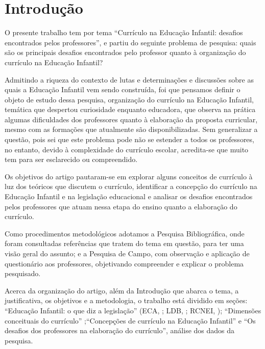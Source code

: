 \begin{refsection}
\begin{otherlanguage}{english}
    \end{otherlanguage}

    \section{Introdução}

    O presente trabalho tem por tema “Currículo na Educação Infantil: desafios encontrados pelos professores”, e partiu do seguinte problema de pesquisa: quais são os principais desafios encontrados pelo professor quanto à organização do currículo na Educação Infantil?  

    Admitindo a riqueza do contexto de lutas e determinações e discussões sobre as quais a Educação Infantil vem sendo construída, foi que pensamos definir o objeto de estudo dessa pesquisa, organização do currículo na Educação Infantil, temática que despertou curiosidade enquanto educadora, que observa na prática algumas dificuldades dos professores quanto à elaboração da proposta curricular, mesmo com as formações que atualmente são disponibilizadas. Sem generalizar a questão, pois sei que este problema pode não se estender a todos os professores, no entanto, devido à complexidade do currículo escolar, acredita-se que muito tem para ser esclarecido ou compreendido. 

    Os objetivos do artigo pautaram-se em explorar alguns conceitos de currículo à luz dos teóricos que discutem o currículo, identificar a concepção do currículo na Educação Infantil e na legislação educacional e analisar os desafios encontrados pelos professores que atuam nessa etapa do ensino quanto a elaboração do currículo. 

    Como procedimentos metodológicos adotamos a Pesquisa Bibliográfica, onde foram consultadas referências que tratem do tema em questão, para ter uma visão geral do assunto; e a Pesquisa de Campo, com observação e aplicação de questionário aos professores, objetivando compreender e explicar o problema pesquisado. 

    Acerca da organização do artigo, além da Introdução que abarca o tema, a justificativa, os objetivos e a metodologia, o trabalho está dividido em seções: “Educação Infantil: o que diz a legislação” (ECA, ; LDB, ; RCNEI, ); “Dimensões conceituais do currículo” \cite{MoreiraAndSilva2005Currículo,CAVALCANTI2011Currículo,SACRISTÁN1999Poderes};“Concepções de currículo na Educação Infantil” \cite{OLIVEIRA2013Novas,BARBOSA2009Práticas,KRAMER2003Formação} e “Os desafios dos professores na elaboração do currículo”, análise dos dados da pesquisa. 


\end{refsection}
